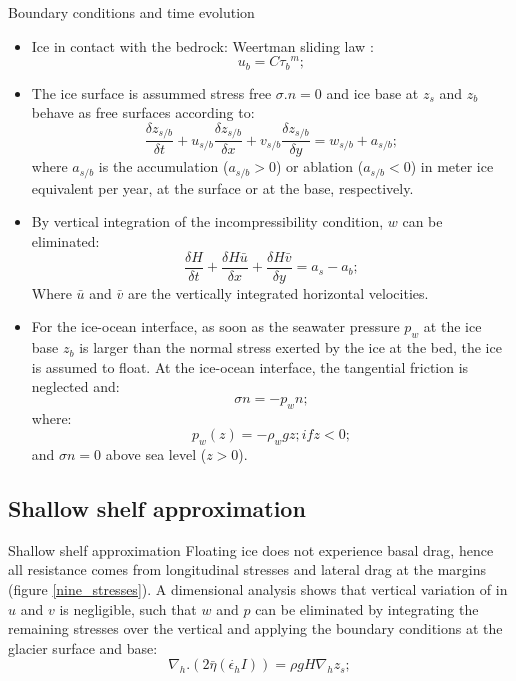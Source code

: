 \documentclass[11pt]{beamer}
\begin{document}
		\begin{frame}[allowframebreaks]{Boundary conditions and time evolution}
		\justifying
			\begin{itemize}
				\item Ice in contact with the bedrock: Weertman sliding law \cite[]{weertman1974stability}:
				\begin{equation}
					u_b=C{\tau_b}^m;
				\end{equation}
				\item The ice surface is assummed stress free $\sigma .n=0$ and ice base at $z_s$ and $z_b$ behave as free surfaces according to:
				\begin{equation}
					\frac{\delta z_{s/b}}{\delta t}+u_{s/b}\frac{\delta z_{s/b}}{\delta x}+v_{s/b}\frac{\delta z_{s/b}}{\delta y}=w_{s/b}+a_{s/b};
				\end{equation}
			where $a_{s/b}$ is the accumulation ($a_{s/b}>0$) or ablation ($a_{s/b}<0$) in meter ice equivalent per year, at the surface or at the base, respectively.
			\item By vertical integration of the incompressibility condition, $w$ can be eliminated:
			\begin{equation}
				\frac{\delta H}{\delta t}+\frac{\delta H\bar{u}}{\delta x}+\frac{\delta H \bar{v}}{\delta y}=a_s-a_b ;
			\end{equation}
			Where $\bar{u}$ and $\bar{v}$ are the vertically integrated horizontal velocities. 
			\item For the ice-ocean interface, as soon as the seawater pressure $p_w$ at the ice base $z_b$ is larger than the normal stress exerted by the ice at the bed, the ice is assumed to float. At the ice-ocean interface, the tangential friction is neglected and:
			\begin{equation}
				\sigma  n=-p_wn ;
			\end{equation}
			where:
			\begin{equation}
				p_w(z)=-\rho_wgz; if z<0;
			\end{equation}
			and $\sigma n=0$ above sea level ($z>0$).
			\end{itemize}
		\end{frame}

	\subsection{Shallow shelf approximation}
		\begin{frame}{Shallow shelf approximation}
			Floating ice does not experience basal drag, hence all resistance comes from longitudinal stresses and lateral drag at the margins (figure \ref{nine_stresses}).
			A dimensional analysis shows that vertical variation of in $u$ and $v$ is negligible, such that $w$ and $p$ can be eliminated by integrating the remaining stresses over the vertical and applying the boundary conditions at the glacier surface and base:
			\begin{equation}
				\nabla_h.(2\bar{\eta}(\dot{\epsilon_h}I))=\rho g H \nabla_h z_s;
			\end{equation}
			
		\end{frame}
\end{document}

